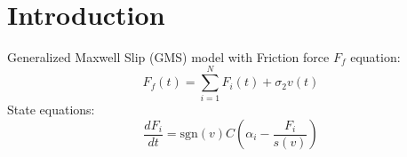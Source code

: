 \documentclass[10pt,a4paper]{article}
\begin{document}
 \\

\section{Introduction}
Generalized Maxwell Slip (GMS) model \cite{Al-Bender2005-sh} with
Friction force $F_f$ equation:
\begin{equation}
F_f(t) = \sum_{i=1}^N F_i(t) + \sigma_2v(t)
\end{equation}
State equations:
\begin{equation}
\frac{dF_i}{dt} = \text{sgn}(v)C \left( \alpha_i - \frac{F_i}{s(v)} \right)
\end{equation}



%

\end{document}
